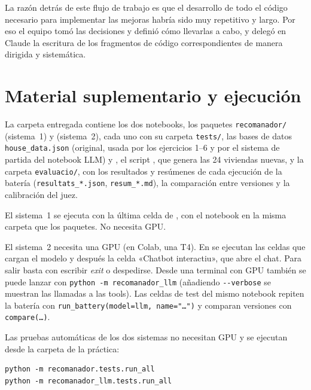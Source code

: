 \documentclass[10pt,a4paper]{article}
\begin{document}
La razón detrás de este flujo de trabajo es que el desarrollo de todo el código necesario para implementar las mejoras habría sido muy repetitivo y largo. Por eso el equipo tomó las decisiones y definió cómo llevarlas a cabo, y delegó en Claude la escritura de los fragmentos de código correspondientes de manera dirigida y sistemática.

\appendix
\section{Material suplementario y ejecución}

La carpeta entregada contiene los dos notebooks, los paquetes \texttt{recomanador/} (sistema~1) y  (sistema~2), cada uno con su carpeta \texttt{tests/}, las bases de datos \texttt{house\_data.json} (original, usada por los ejercicios 1--6 y por el sistema de partida del notebook LLM) y , el script , que genera las 24 viviendas nuevas, y la carpeta \texttt{evaluacio/}, con los resultados y resúmenes de cada ejecución de la batería (\texttt{resultats\_*.json}, \texttt{resum\_*.md}), la comparación entre versiones y la calibración del juez.

El sistema~1 se ejecuta con la última celda de , con el notebook en la misma carpeta que los paquetes. No necesita GPU.

El sistema~2 necesita una GPU (en Colab, una T4). En  se ejecutan las celdas que cargan el modelo y después la celda «Chatbot interactiu», que abre el chat. Para salir basta con escribir \emph{exit} o despedirse. Desde una terminal con GPU también se puede lanzar con \texttt{python -m recomanador\_llm} (añadiendo \texttt{-{}-verbose} se muestran las llamadas a las tools). Las celdas de test del mismo notebook repiten la batería con \texttt{run\_battery(model=llm, name="\ldots")} y comparan versiones con \texttt{compare(\ldots)}.

Las pruebas automáticas de los dos sistemas no necesitan GPU y se ejecutan desde la carpeta de la práctica:

\begin{verbatim}
python -m recomanador.tests.run_all
python -m recomanador_llm.tests.run_all
\end{verbatim}
\end{document}
